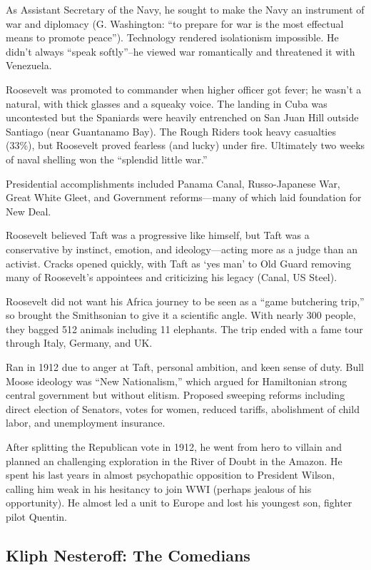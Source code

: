 \documentclass[
]{article}
\begin{document}
As Assistant Secretary of the Navy, he sought to make the Navy an
instrument of war and diplomacy (G. Washington: ``to prepare for war is
the most effectual means to promote peace''). Technology rendered
isolationism impossible. He didn't always ``speak softly''--he viewed
war romantically and threatened it with Venezuela.

Roosevelt was promoted to commander when higher officer got fever; he
wasn't a natural, with thick glasses and a squeaky voice. The landing in
Cuba was uncontested but the Spaniards were heavily entrenched on San
Juan Hill outside Santiago (near Guantanamo Bay). The Rough Riders took
heavy casualties (33\%), but Roosevelt proved fearless (and lucky) under
fire. Ultimately two weeks of naval shelling won the ``splendid little
war.''

Presidential accomplishments included Panama Canal, Russo-Japanese War,
Great White Gleet, and Government reforms---many of which laid
foundation for New Deal.

Roosevelt believed Taft was a progressive like himself, but Taft was a
conservative by instinct, emotion, and ideology---acting more as a judge
than an activist. Cracks opened quickly, with Taft as `yes man' to Old
Guard removing many of Roosevelt's appointees and criticizing his legacy
(Canal, US Steel).

Roosevelt did not want his Africa journey to be seen as a ``game
butchering trip,'' so brought the Smithsonian to give it a scientific
angle. With nearly 300 people, they bagged 512 animals including 11
elephants. The trip ended with a fame tour through Italy, Germany, and
UK.

Ran in 1912 due to anger at Taft, personal ambition, and keen sense of
duty. Bull Moose ideology was ``New Nationalism,'' which argued for
Hamiltonian strong central government but without elitism. Proposed
sweeping reforms including direct election of Senators, votes for women,
reduced tariffs, abolishment of child labor, and unemployment insurance.

After splitting the Republican vote in 1912, he went from hero to
villain and planned an challenging exploration in the River of Doubt in
the Amazon. He spent his last years in almost psychopathic opposition to
President Wilson, calling him weak in his hesitancy to join WWI (perhaps
jealous of his opportunity). He almost led a unit to Europe and lost his
youngest son, fighter pilot Quentin.

\hypertarget{kliph-nesteroff-the-comedians}{%
\subsection{Kliph Nesteroff: The
Comedians}\label{kliph-nesteroff-the-comedians}}
\end{document}
